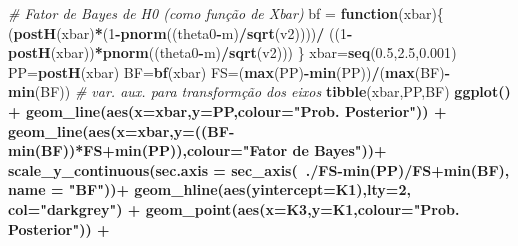 \documentclass[
]{book}
\newenvironment{Shaded}{\begin{snugshade}}{\end{snugshade}}
\newcommand{\CommentTok}[1]{\textcolor[rgb]{0.56,0.35,0.01}{\textit{#1}}}
\newcommand{\ControlFlowTok}[1]{\textcolor[rgb]{0.13,0.29,0.53}{\textbf{#1}}}
\newcommand{\DataTypeTok}[1]{\textcolor[rgb]{0.13,0.29,0.53}{#1}}
\newcommand{\DecValTok}[1]{\textcolor[rgb]{0.00,0.00,0.81}{#1}}
\newcommand{\FloatTok}[1]{\textcolor[rgb]{0.00,0.00,0.81}{#1}}
\newcommand{\KeywordTok}[1]{\textcolor[rgb]{0.13,0.29,0.53}{\textbf{#1}}}
\newcommand{\NormalTok}[1]{#1}
\newcommand{\OperatorTok}[1]{\textcolor[rgb]{0.81,0.36,0.00}{\textbf{#1}}}
\newcommand{\StringTok}[1]{\textcolor[rgb]{0.31,0.60,0.02}{#1}}
\begin{document}
\begin{Shaded}
\begin{Highlighting}[]
\CommentTok{# Fator de Bayes de H0 (como função de Xbar)}
\NormalTok{bf =}\StringTok{ }\ControlFlowTok{function}\NormalTok{(xbar)\{}
\NormalTok{  (}\KeywordTok{postH}\NormalTok{(xbar)}\OperatorTok{*}\NormalTok{(}\DecValTok{1}\OperatorTok{-}\KeywordTok{pnorm}\NormalTok{((theta0}\OperatorTok{-}\NormalTok{m)}\OperatorTok{/}\KeywordTok{sqrt}\NormalTok{(v2))))}\OperatorTok{/}\StringTok{ }\NormalTok{((}\DecValTok{1}\OperatorTok{-}\KeywordTok{postH}\NormalTok{(xbar))}\OperatorTok{*}\KeywordTok{pnorm}\NormalTok{((theta0}\OperatorTok{-}\NormalTok{m)}\OperatorTok{/}\KeywordTok{sqrt}\NormalTok{(v2))) \}}
\NormalTok{xbar=}\KeywordTok{seq}\NormalTok{(}\FloatTok{0.5}\NormalTok{,}\FloatTok{2.5}\NormalTok{,}\FloatTok{0.001}\NormalTok{)}
\NormalTok{PP=}\KeywordTok{postH}\NormalTok{(xbar)}
\NormalTok{BF=}\KeywordTok{bf}\NormalTok{(xbar)}
\NormalTok{FS=(}\KeywordTok{max}\NormalTok{(PP)}\OperatorTok{-}\KeywordTok{min}\NormalTok{(PP))}\OperatorTok{/}\NormalTok{(}\KeywordTok{max}\NormalTok{(BF)}\OperatorTok{-}\KeywordTok{min}\NormalTok{(BF)) }\CommentTok{# var. aux. para transformção dos eixos}
\KeywordTok{tibble}\NormalTok{(xbar,PP,BF) }\OperatorTok{%
\StringTok{  }\KeywordTok{ggplot}\NormalTok{() }\OperatorTok{+}
\StringTok{    }\KeywordTok{geom_line}\NormalTok{(}\KeywordTok{aes}\NormalTok{(}\DataTypeTok{x=}\NormalTok{xbar,}\DataTypeTok{y=}\NormalTok{PP,}\DataTypeTok{colour=}\StringTok{"Prob. Posterior"}\NormalTok{)) }\OperatorTok{+}
\StringTok{    }\KeywordTok{geom_line}\NormalTok{(}\KeywordTok{aes}\NormalTok{(}\DataTypeTok{x=}\NormalTok{xbar,}\DataTypeTok{y=}\NormalTok{((BF}\OperatorTok{-}\KeywordTok{min}\NormalTok{(BF))}\OperatorTok{*}\NormalTok{FS}\OperatorTok{+}\KeywordTok{min}\NormalTok{(PP)),}\DataTypeTok{colour=}\StringTok{"Fator de Bayes"}\NormalTok{))}\OperatorTok{+}
\StringTok{    }\KeywordTok{scale_y_continuous}\NormalTok{(}\DataTypeTok{sec.axis =} \KeywordTok{sec_axis}\NormalTok{(}\OperatorTok{~}\NormalTok{.}\OperatorTok{/}\NormalTok{FS}\OperatorTok{-}\KeywordTok{min}\NormalTok{(PP)}\OperatorTok{/}\NormalTok{FS}\OperatorTok{+}\KeywordTok{min}\NormalTok{(BF), }\DataTypeTok{name =} \StringTok{"BF"}\NormalTok{))}\OperatorTok{+}
\StringTok{    }\KeywordTok{geom_hline}\NormalTok{(}\KeywordTok{aes}\NormalTok{(}\DataTypeTok{yintercept=}\NormalTok{K1),}\DataTypeTok{lty=}\DecValTok{2}\NormalTok{, }\DataTypeTok{col=}\StringTok{"darkgrey"}\NormalTok{) }\OperatorTok{+}
\StringTok{    }\KeywordTok{geom_point}\NormalTok{(}\KeywordTok{aes}\NormalTok{(}\DataTypeTok{x=}\NormalTok{K3,}\DataTypeTok{y=}\NormalTok{K1,}\DataTypeTok{colour=}\StringTok{"Prob. Posterior"}\NormalTok{)) }\OperatorTok{+}
}
\end{Highlighting}
\end{Shaded}
\end{document}
